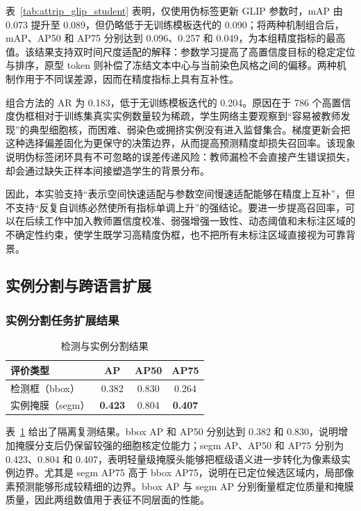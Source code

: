 表~\ref{tab:attrip_glip_student} 表明，仅使用伪标签更新 GLIP 参数时，mAP 由 0.073 提升至 0.089，但仍略低于无训练模板迭代的 0.090；将两种机制组合后，mAP、AP50 和 AP75 分别达到 0.096、0.257 和 0.049，为本组精度指标的最高值。该结果支持双时间尺度适配的解释：参数学习提高了高置信度目标的稳定定位与排序，原型 token 则补偿了冻结文本中心与当前染色风格之间的偏移。两种机制作用于不同误差源，因而在精度指标上具有互补性。

组合方法的 AR 为 0.183，低于无训练模板迭代的 0.204。原因在于 786 个高置信度伪框相对于训练集真实实例数量较为稀疏，学生网络主要观察到“容易被教师发现”的典型细胞核，而困难、弱染色或拥挤实例没有进入监督集合。梯度更新会把这种选择偏差固化为更保守的决策边界，从而提高预测精度却损失召回率。该现象说明伪标签闭环具有不可忽略的误差传递风险：教师漏检不会直接产生错误损失，却会通过缺失正样本间接塑造学生的背景分布。

因此，本实验支持“表示空间快速适配与参数空间慢速适配能够在精度上互补”，但不支持“反复自训练必然使所有指标单调上升”的强结论。要进一步提高召回率，可以在后续工作中加入教师置信度校准、弱强增强一致性、动态阈值和未标注区域的不确定性约束，使学生既学习高精度伪框，也不把所有未标注区域直接视为可靠背景。

\subsection{实例分割与跨语言扩展}

\subsubsection{实例分割任务扩展结果}

\begin{table}[htbp]
\centering
\caption{检测与实例分割结果}
\label{tab:attrip_mask_head}
\begin{tabular}{lccc}
\toprule[1.5pt]
\textbf{评价类型} & \textbf{AP} & \textbf{AP50} & \textbf{AP75} \\ \midrule[1.2pt]
检测框（bbox） & 0.382 & 0.830 & 0.264 \\
实例掩膜（segm） & \textbf{0.423} & 0.804 & \textbf{0.407} \\ \bottomrule[1.5pt]
\end{tabular}
\end{table}

表~\ref{tab:attrip_mask_head} 给出了隔离复测结果。bbox AP 和 AP50 分别达到 0.382 和 0.830，说明增加掩膜分支后仍保留较强的细胞核定位能力；segm AP、AP50 和 AP75 分别为 0.423、0.804 和 0.407，表明轻量级掩膜头能够把框级语义进一步转化为像素级实例边界。尤其是 segm AP75 高于 bbox AP75，说明在已定位候选区域内，局部像素预测能够形成较精细的边界。bbox AP 与 segm AP 分别衡量框定位质量和掩膜质量，因此两组数值用于表征不同层面的性能。

